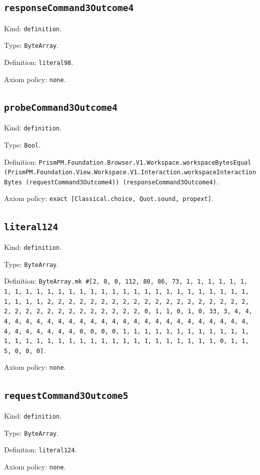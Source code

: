 \documentclass[11pt]{article}
\begin{document}
\subsection*{\texttt{responseCommand3Outcome4}}
\noindent Kind: \texttt{definition}.\par
\noindent Type: \texttt{ByteArray}.\par
\noindent Definition: \texttt{literal98}.\par
\noindent Axiom policy: \texttt{none}.\par
\subsection*{\texttt{probeCommand3Outcome4}}
\noindent Kind: \texttt{definition}.\par
\noindent Type: \texttt{Bool}.\par
\noindent Definition: \texttt{PrismPM.Foundation.Browser.V1.Workspace.workspaceBytesEqual (PrismPM.Foundation.View.Workspace.V1.Interaction.workspaceInteractionBytes (requestCommand3Outcome4)) (responseCommand3Outcome4)}.\par
\noindent Axiom policy: \texttt{exact [Classical.choice, Quot.sound, propext]}.\par
\subsection*{\texttt{literal124}}
\noindent Kind: \texttt{definition}.\par
\noindent Type: \texttt{ByteArray}.\par
\noindent Definition: \texttt{ByteArray.mk \#[2, 0, 0, 112, 80, 86, 73, 1, 1, 1, 1, 1, 1, 1, 1, 1, 1, 1, 1, 1, 1, 1, 1, 1, 1, 1, 1, 1, 1, 1, 1, 1, 1, 1, 1, 1, 1, 1, 1, 1, 2, 2, 2, 2, 2, 2, 2, 2, 2, 2, 2, 2, 2, 2, 2, 2, 2, 2, 2, 2, 2, 2, 2, 2, 2, 2, 2, 2, 2, 2, 2, 2, 0, 1, 1, 0, 1, 0, 33, 3, 4, 4, 4, 4, 4, 4, 4, 4, 4, 4, 4, 4, 4, 4, 4, 4, 4, 4, 4, 4, 4, 4, 4, 4, 4, 4, 4, 4, 4, 4, 4, 4, 0, 0, 0, 0, 1, 1, 1, 1, 1, 1, 1, 1, 1, 1, 1, 1, 1, 1, 1, 1, 1, 1, 1, 1, 1, 1, 1, 1, 1, 1, 1, 1, 1, 1, 1, 1, 0, 1, 1, 5, 0, 0, 0]}.\par
\noindent Axiom policy: \texttt{none}.\par
\subsection*{\texttt{requestCommand3Outcome5}}
\noindent Kind: \texttt{definition}.\par
\noindent Type: \texttt{ByteArray}.\par
\noindent Definition: \texttt{literal124}.\par
\noindent Axiom policy: \texttt{none}.\par
\end{document}

